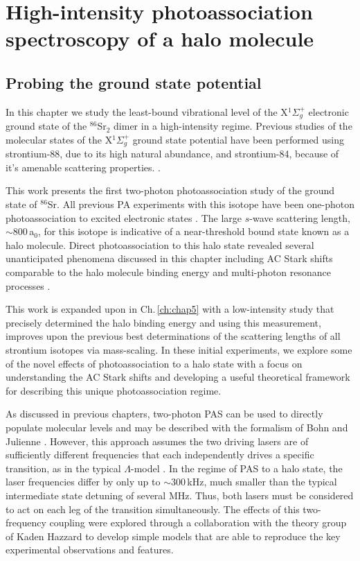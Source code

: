 \chapter{High-intensity photoassociation spectroscopy of a halo molecule} \label{ch:chap4}
\section{Probing the ground state potential} \label{sec:highE_intro}
In this chapter we study the least-bound vibrational level of the X$^1\Sigma_g^+$ electronic ground state of the $^{86}$Sr$_2$ dimer in a high-intensity regime.
Previous studies of the molecular states of the X$^1\Sigma_g^+$ ground state potential have been performed using strontium-88, due to its high natural abundance, and strontium-84, because of it's amenable scattering properties. \cite{Reinaudi2012, McGuyer2014, McGuyer2015a, rom12, Stellmer2012}.

This work presents the first two-photon photoassociation study of the ground state of $^{86}$Sr.
All previous PA experiments with this isotope have been one-photon photoassociation to excited electronic states \cite{Mickelson2005,Borkowski2014a,Reschovsky2018}.
The large $s$-wave scattering length, $\sim$800\,a$_0$, for this isotope is indicative of a near-threshold bound state known as a halo molecule.
Direct photoassociation to this halo state revealed several unanticipated phenomena discussed in this chapter including AC Stark shifts comparable to the halo molecule binding energy and multi-photon resonance processes \cite{Kon2018}.

This work is expanded upon in Ch.\,\ref{ch:chap5} with a low-intensity study that precisely determined the halo binding energy and using this measurement, improves upon the previous best determinations of the scattering lengths of all strontium isotopes via mass-scaling.
In these initial experiments, we explore some of the novel effects of photoassociation to a halo state with a focus on understanding the AC Stark shifts and developing a useful theoretical framework for describing this unique photoassociation regime.

As discussed in previous chapters, two-photon PAS can be used to directly populate molecular levels and may be described with the formalism of Bohn and Julienne \cite{Bohn1999}.
However, this approach assumes the two driving lasers are of sufficiently different frequencies that each independently drives a specific transition, as in the typical $\Lambda$-model \cite{Wynar2000, Bohn1996}.
In the regime of PAS to a halo state, the laser frequencies differ by only up to $\sim\!300$\,kHz, much smaller than the typical intermediate state detuning of several MHz.
Thus, both lasers must be considered to act on each leg of the transition simultaneously.
The effects of this two-frequency coupling were explored through a collaboration with the theory group of Kaden Hazzard to develop simple models that are able to reproduce the key experimental observations and features.

